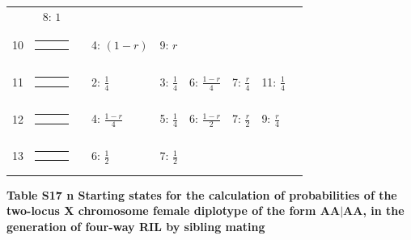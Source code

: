 \documentclass[9pt,letterpaper,twoside]{article}
\begin{document}
{\begin{center}
\begin{tabular}{cccllllll}
& 8: $1$
& & & & & \\
10 &
{\renewcommand{\arraystretch}{0.3}
\renewcommand{\tabcolsep}{0.5mm}
\parbox[b][3mm][c]{12mm}{
\begin{tabular}{|p{2mm}|p{2mm}||p{2mm}|} \hline
          &           & $\bullet$ \\
          &           & $\bullet$ \\ \hline
\end{tabular}}}
&
& 4: $(1-r)$
& 9: $r$
& & & & \\
11 &
{\renewcommand{\arraystretch}{0.3}
\renewcommand{\tabcolsep}{0.5mm}
\parbox[b][3mm][c]{12mm}{
\begin{tabular}{|p{2mm}|p{2mm}||p{2mm}|} \hline
$\bullet$ & $\bullet$ &           \\
$\bullet$ &           & $\bullet$ \\ \hline
\end{tabular}}}
&
& 2: $\frac{1}{4}$
& 3: $\frac{1}{4}$
& 6: $\frac{1-r}{4}$
& 7: $\frac{r}{4}$
& 11: $\frac{1}{4}$
& \\
12 &
{\renewcommand{\arraystretch}{0.3}
\renewcommand{\tabcolsep}{0.5mm}
\parbox[b][3mm][c]{12mm}{
\begin{tabular}{|p{2mm}|p{2mm}||p{2mm}|} \hline
$\bullet$ &           & $\bullet$ \\
          &           & $\bullet$ \\ \hline
\end{tabular}}}
&
& 4: $\frac{1-r}{4}$
& 5: $\frac{1}{4}$
& 6: $\frac{1-r}{2}$
& 7: $\frac{r}{2}$
& 9: $\frac{r}{4}$
& \\
13 &
{\renewcommand{\arraystretch}{0.3}
\renewcommand{\tabcolsep}{0.5mm}
\parbox[b][3mm][c]{12mm}{
\begin{tabular}{|p{2mm}|p{2mm}||p{2mm}|} \hline
$\bullet$ & $\bullet$ &           \\
          &           & $\bullet$ \\ \hline
\end{tabular}}}
&
& 6: $\frac{1}{2}$
& 7: $\frac{1}{2}$
& & & & \\
\hline
\end{tabular}
\end{center}
}
\newpage

\noindent \textbf{Table S17 {\color{white} n} Starting states for the calculation of
probabilities of the two-locus X chromosome female diplotype of the form $\boldsymbol{AA|AA}$, 
in the generation of four-way RIL by sibling mating}

\bigskip
\end{document}

